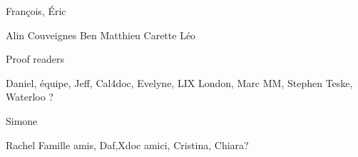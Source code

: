 

François, Éric

Alin
Couveignes
Ben
Matthieu
Carette
Léo

Proof readers

Daniel, équipe, Jeff, 
Cal4doc, 
Evelyne, LIX
London, Marc MM, Stephen
Teske, Waterloo ?

Simone

Rachel
Famille
amis, Daf,Xdoc
amici, Cristina, Chiara?



